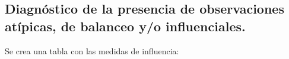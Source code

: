 \documentclass[
]{article}
\newenvironment{Shaded}{\begin{snugshade}}{\end{snugshade}}
\newcommand{\FunctionTok}[1]{\textcolor[rgb]{0.00,0.00,0.00}{#1}}
\newcommand{\NormalTok}[1]{#1}
\newcommand{\OtherTok}[1]{\textcolor[rgb]{0.56,0.35,0.01}{#1}}
\newcommand{\SpecialCharTok}[1]{\textcolor[rgb]{0.00,0.00,0.00}{#1}}
\begin{document}
\hypertarget{diagnuxf3stico-de-la-presencia-de-observaciones-atuxedpicas-de-balanceo-yo-influenciales.}{%
\subsection{Diagnóstico de la presencia de observaciones atípicas, de
balanceo y/o
influenciales.}\label{diagnuxf3stico-de-la-presencia-de-observaciones-atuxedpicas-de-balanceo-yo-influenciales.}}

Se crea una tabla con las medidas de influencia:

\begin{Shaded}
\end{Shaded}
\end{document}

